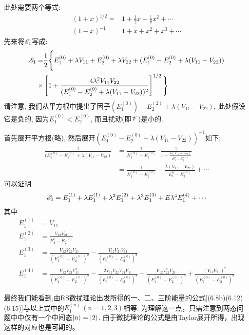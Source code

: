 此处需要两个等式:
\begin{align}
	(1+x)^{1/2} =& 1 + \frac{1}{2} x - \frac{1}{8} x^2 + \cdots\\
	(1-x)^{-1}  =& 1 +x +x^2 +x^3+\cdots
\end{align}
先来将$\mathscr{E}_1$写成:
\begin{align*}
\mathscr{E}_1 = & \frac{1}{2} \Bigg\{ E_1^{(0)} + \lambda V_{11} + E_2^{(0)} + \lambda V_{22} + (E_1^{(0)} -E_2^{(0)} +\lambda(V_{11} - V_{22}) ) \\
\times & \left[1 + \frac{4\lambda^2V_{11}V_{22}}{(E_1^{(0)}  - E_2^{(0)} + \lambda(V_{11}-V_{22}) )^2} \right]^{1/2}
     \Bigg\}
\end{align*}
请注意, 我们从平方根中提出了因子$(E_1^{(0)}) - E_2^{(2)} +\lambda(V_{11}-V_{22}) $, 此处假设它是负的, 因为$E_1^{(0)}<E_2^{(0)}$, 而且扰动(即$\mathscr{V}$)是小的.

首先展开平方根(略), 然后展开$(E_1^{(0)}-E_2^{(0)} + \lambda(V_{11}-V_{22}))^{-1}$如下:
\begin{align*}
	\frac{1}{(E_1^{(0)}-E_2^{(0)} + \lambda(V_{11}-V_{22})} & =\frac{1}{E_1^{(0)} - E_2^{(0) }}\cdot \frac{1}{1+\frac{\lambda(V_{11}-V_{22}) }{E_1^{0} -E_2^{(0)} }}\\
		& = \frac{1}{E_1^{(0)} - E_2^{(0)}} - \frac{\lambda(V_{11}-V_{22}) }{E_1^{0} -E_2^{(0)} }+\cdots
\end{align*}
可以证明
\begin{align}
\mathscr{E}_1 = E_1^{(1)} + \lambda E_1^{(1)} + \lambda^2 E_1^{(2)} + \lambda^3 E_1^{(3)} + E\lambda^4 E_1^{(4)} + \cdots
\end{align}
其中
\begin{subequations}
	\begin{align}
	E_1^{(1)} &= V_{11} \\
	E_1^{(2)} &= \frac{V_{12}V_{21}}{E_1^{0} - E_2^{(0)}} \\
	E_1^{(3)} &= \frac{V_{12} V_{22} V_{21} }{(E_1^{(0)} - E_2^{(0)})^2} - \frac{V_{12} V_{21} V_{11} }{ (E_1^{(0)} - E_2^{(0)})^2 }\\
	E_1^{(4)} &= \frac{V_{12} V_{21} V_{11}^2 }{(E_1^{(0)} - E_2^{(0)})^3} - \frac{2 V_{12} V_{22} V_{21} V_{11} }{(E_1^{(0)} - E_2^{(0)})^3} + \frac{V_{12} V_{22}^2 V_{21} }{(E_1^{(0)} - E_2^{(0)})^3} + \frac{ (V_{12} V_{21})^2 }{(E_1^{(0)} - E_2^{(0)})^3}
	\end{align}
\end{subequations}

最终我们能看到,由RS微扰理论出发所得的一、二、三阶能量的公式[(6.8b)(6.12)(6.15)]与以上式中的$E_1^{(n)}\,(n=1,2,3)$相等. 为理解这一点，只需注意到两态问题中中仅有一个中间态$\Ket{n} = \Ket{2}$. 由于微扰理论的公式是由Taylor展开所得，出现这样的对应也是可期的。

